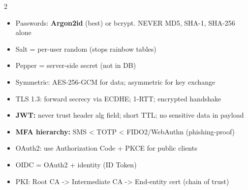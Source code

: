 \documentclass[11pt, letterpaper]{article}
\begin{document}
\vspace{4pt}

\begin{tcolorbox}[colback=part5bg, colframe=sectionteal,
  title={\bfseries Cryptography \& Authentication}, arc=3pt, boxrule=1pt]
\footnotesize
\begin{multicols}{2}
\begin{itemize}[noitemsep, leftmargin=*]
  \item Passwords: \textbf{Argon2id} (best) or bcrypt. NEVER MD5, SHA-1, SHA-256 alone
  \item Salt = per-user random (stops rainbow tables)
  \item Pepper = server-side secret (not in DB)
  \item Symmetric: AES-256-GCM for data; asymmetric for key exchange
  \item TLS 1.3: forward secrecy via ECDHE; 1-RTT; encrypted handshake
\end{itemize}
\columnbreak
\begin{itemize}[noitemsep, leftmargin=*]
  \item \textbf{JWT:} never trust header alg field; short TTL; no sensitive data in payload
  \item \textbf{MFA hierarchy:} SMS < TOTP < FIDO2/WebAuthn (phishing-proof)
  \item OAuth2: use Authorization Code + PKCE for public clients
  \item OIDC = OAuth2 + identity (ID Token)
  \item PKI: Root CA -> Intermediate CA -> End-entity cert (chain of trust)
\end{itemize}
\end{multicols}
\end{tcolorbox}

\vspace{4pt}
\end{document}
